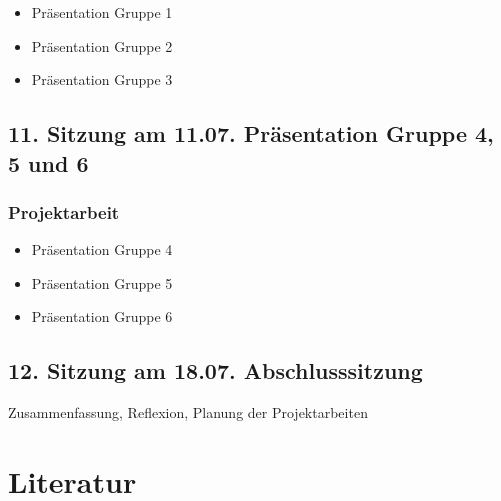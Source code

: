\documentclass[
  ngerman,
]{article}
\providecommand{\tightlist}{%
  \setlength{\itemsep}{0pt}\setlength{\parskip}{0pt}}
\begin{document}
\begin{itemize}
\tightlist
\item
  Präsentation Gruppe 1
\item
  Präsentation Gruppe 2
\item
  Präsentation Gruppe 3
\end{itemize}

\hypertarget{sitzung-am-11.07.-pruxe4sentation-gruppe-4-5-und-6}{%
\subsection*{11. Sitzung am 11.07. \textbar{} Präsentation Gruppe 4, 5 und 6}\label{sitzung-am-11.07.-pruxe4sentation-gruppe-4-5-und-6}}

\hypertarget{projektarbeit-8}{%
\subsubsection*{Projektarbeit}\label{projektarbeit-8}}

\begin{itemize}
\tightlist
\item
  Präsentation Gruppe 4
\item
  Präsentation Gruppe 5
\item
  Präsentation Gruppe 6
\end{itemize}

\hypertarget{sitzung-am-18.07.-abschlusssitzung}{%
\subsection*{12. Sitzung am 18.07. \textbar{} Abschlusssitzung}\label{sitzung-am-18.07.-abschlusssitzung}}

Zusammenfassung, Reflexion, Planung der Projektarbeiten

\hypertarget{literatur}{%
\section*{Literatur}\label{literatur}}
\end{document}
